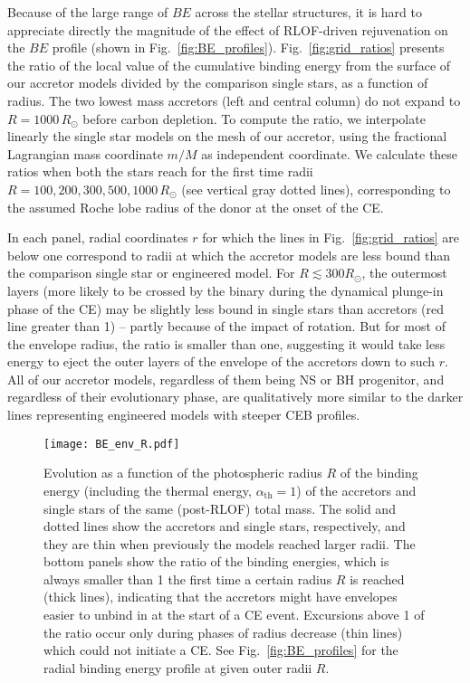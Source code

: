 \documentclass[twocolumn,twocolappendix,trackchanges]{aastex63}
\DeclareRobustCommand{\Figref}[1]{Fig.~\ref{#1}}
\begin{document}
Because of the large range of $BE$ across the stellar structures, it
is hard to appreciate directly the magnitude of the effect of RLOF-driven
rejuvenation on the $BE$ profile (shown in \Figref{fig:BE_profiles}). \Figref{fig:grid_ratios} presents the
ratio of the local value of the cumulative binding energy from the
surface of our accretor models divided by the
comparison single stars, as a function of radius. The two
lowest mass accretors (left and central column) do not expand to
$R=1000\, R_\odot$ before carbon depletion. To compute the
ratio, we interpolate linearly the single star models on the mesh of
our accretor, using the fractional Lagrangian mass coordinate $m/M$ as
independent coordinate.
We calculate these ratios
when both the stars reach for the first time radii
$R=100, 200, 300, 500, 1000\,R_\odot$ (see vertical gray dotted
lines), corresponding to the assumed Roche lobe radius of the donor at
the onset of the CE.

In each panel, radial coordinates $r$ for which the lines in
\Figref{fig:grid_ratios} are below one correspond to radii at which
the accretor models are less bound than the comparison single star or
engineered model. For $R\lesssim 300R_\odot$, the outermost layers
(more likely to be crossed by the binary during the dynamical
plunge-in phase of the CE) may be slightly less bound in single stars
than accretors (red line greater than 1) -- partly because of
the impact of rotation. But for most of the envelope
radius, the ratio is smaller than one, suggesting it would take less
energy to eject the outer layers of the envelope of the accretors down
to such $r$. All of our accretor models, regardless of them being NS
or BH progenitor, and regardless of their evolutionary phase,
are qualitatively more similar to the darker lines
representing engineered models with steeper CEB profiles.


\begin{figure}[htbp]
  \centering
  \texttt{[image: BE\_env\_R.pdf]}
  \caption{Evolution as a function of the photospheric radius $R$ of
    the binding energy (including the thermal energy,
    $\alpha_\mathrm{th}=1$) of the accretors and single stars of the
    same (post-RLOF) total mass. The solid and dotted lines show the
    accretors and single stars, respectively, and they are thin when
    previously the models reached larger radii. The bottom panels show
    the ratio of the binding energies, which is always smaller than 1
    the first time a certain radius $R$ is reached (thick lines),
    indicating that the accretors might have envelopes easier to
    unbind in at the start of a CE event. Excursions above 1 of the
    ratio occur only during phases of radius decrease (thin lines)
    which could not initiate a CE. See \Figref{fig:BE_profiles} for
    the radial binding energy profile at given outer radii $R$.}
  \label{fig:BE_env_R}
\end{figure}
\end{document}
